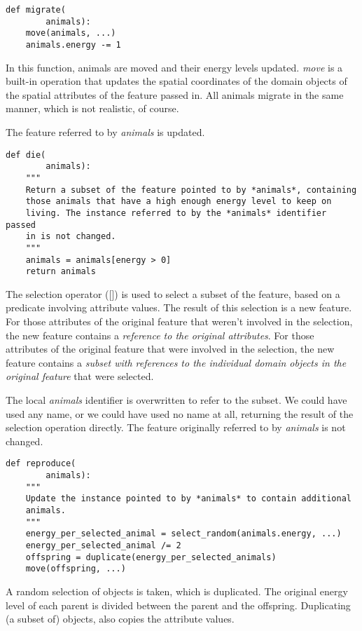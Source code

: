 \documentclass[10pt, a4paper]{article}
\begin{document}
\begin{lstlisting}
def migrate(
        animals):
    move(animals, ...)
    animals.energy -= 1
\end{lstlisting}

In this function, animals are moved and their energy levels updated. \emph{move} is a built-in operation that updates the spatial coordinates of the domain objects of the spatial attributes of the feature passed in. All animals migrate in the same manner, which is not realistic, of course.

The feature referred to by \emph{animals} is updated.

\begin{lstlisting}
def die(
        animals):
    """
    Return a subset of the feature pointed to by *animals*, containing
    those animals that have a high enough energy level to keep on
    living. The instance referred to by the *animals* identifier passed
    in is not changed.
    """
    animals = animals[energy > 0]
    return animals
\end{lstlisting}

The selection operator ([]) is used to select a subset of the feature, based on a predicate involving attribute values. The result of this selection is a new feature. For those attributes of the original feature that weren't involved in the selection, the new feature contains a \emph{reference to the original attributes}. For those attributes of the original feature that were involved in the selection, the new feature contains a \emph{subset with references to the individual domain objects in the original feature} that were selected.

The local \emph{animals} identifier is overwritten to refer to the subset. We could have used any name, or we could have used no name at all, returning the result of the selection operation directly. The feature originally referred to by \emph{animals} is not changed.

\begin{lstlisting}
def reproduce(
        animals):
    """
    Update the instance pointed to by *animals* to contain additional
    animals.
    """
    energy_per_selected_animal = select_random(animals.energy, ...)
    energy_per_selected_animal /= 2
    offspring = duplicate(energy_per_selected_animals)
    move(offspring, ...)
\end{lstlisting}

A random selection of objects is taken, which is duplicated. The original energy level of each parent is divided between the parent and the offspring. Duplicating (a subset of) objects, also copies the attribute values.
\end{document}
